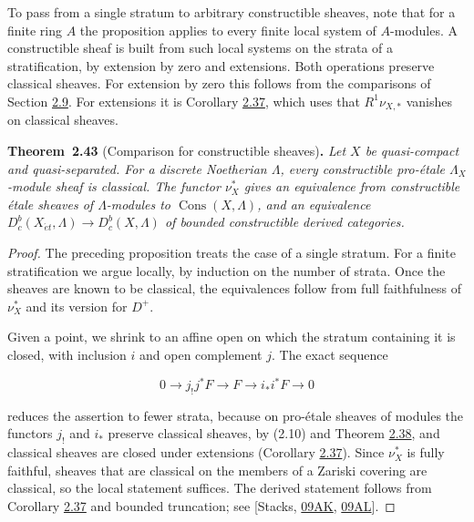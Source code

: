 \documentclass[11pt]{article}
\newenvironment{bpstatement}[2]{\par\addvspace{0.6\baselineskip}\noindent\textbf{#1}#2\textbf{.}\enspace\ignorespaces}
  {\par\addvspace{0.4\baselineskip}}
\newenvironment{bpstatementit}[2]{\begin{bpstatement}{#1}{#2}\itshape\ignorespaces}{\end{bpstatement}}
\providecommand{\Cons}{}\renewcommand{\Cons}{\operatorname{Cons}}
\providecommand{\Dbc}{}\renewcommand{\Dbc}{D^b_c}
\begin{document}
\label{bp128}%
To pass from a single stratum to arbitrary constructible sheaves, note that for a finite ring \(A\) the proposition applies to every finite local system of \(A\)-modules. A constructible sheaf is built from such local systems on the strata of a stratification, by extension by zero and extensions. Both operations preserve classical sheaves. For extension by zero this follows from the comparisons of Section \hyperref[bp111]{2.9}. For extensions it is Corollary \hyperref[bp109]{2.37}, which uses that \(R^1\nu_{X,*}\) vanishes on classical sheaves.

\label{bp129}%
\begin{bpstatementit}{Theorem~2.43}{ (Comparison for constructible sheaves)}
Let \(X\) be quasi-compact and quasi-separated. For a discrete Noetherian \(\Lambda\), every constructible pro-étale \(\Lambda_X\)-module sheaf is classical. The functor \(\nu_X^*\) gives an equivalence from constructible étale sheaves of \(\Lambda\)-modules to \(\Cons(X,\Lambda)\), and an equivalence \(D^b_c(X_{\acute{e}t},\Lambda)\to\Dbc(X,\Lambda)\) of bounded constructible derived categories.
\end{bpstatementit}

\begin{proof}[{Proof}]\label{bp130}%
The preceding proposition treats the case of a single stratum. For a finite stratification we argue locally, by induction on the number of strata. Once the sheaves are known to be classical, the equivalences follow from full faithfulness of \(\nu_X^*\) and its version for \(D^+\).

Given a point, we shrink to an affine open on which the stratum containing it is closed, with inclusion \(i\) and open complement \(j\). The exact sequence

\[
0\longrightarrow j_!j^*F\longrightarrow F
\longrightarrow i_*i^*F\longrightarrow0
\]

reduces the assertion to fewer strata, because on pro-étale sheaves of modules the functors \(j_!\) and \(i_*\) preserve classical sheaves, by (2.10) and Theorem \hyperref[bp113]{2.38}, and classical sheaves are closed under extensions (Corollary \hyperref[bp109]{2.37}). Since \(\nu_X^*\) is fully faithful, sheaves that are classical on the members of a Zariski covering are classical, so the local statement suffices. The derived statement follows from Corollary \hyperref[bp109]{2.37} and bounded truncation; see [Stacks, \href{https://stacks.math.columbia.edu/tag/09AK}{09AK}, \href{https://stacks.math.columbia.edu/tag/09AL}{09AL}].
\end{proof}
\end{document}
